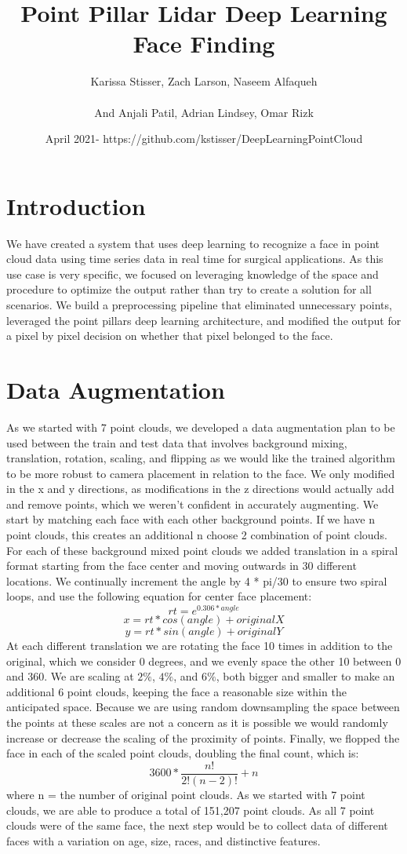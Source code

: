 \documentclass{article}
\title{Point Pillar Lidar Deep Learning Face Finding}
\author{Karissa Stisser, Zach Larson, Naseem Alfaqueh\\ \\And Anjali Patil, Adrian Lindsey, Omar Rizk }
\date{April 2021- https://github.com/kstisser/DeepLearningPointCloud}
\begin{document}
 
\maketitle 

\section{Introduction} We have created a system that uses deep learning to recognize a face in point cloud data using time series data in real time for surgical applications. As this use case is very specific, we focused on leveraging knowledge of the space and procedure to optimize the output rather than try to create a solution for all scenarios. We build a preprocessing pipeline that eliminated unnecessary points, leveraged the point pillars deep learning architecture\cite{pointpillars}, and modified the output for a pixel by pixel decision on whether that pixel belonged to the face. 

\section{Data Augmentation} As we started with 7 point clouds, we developed a data augmentation plan to be used between the train and test data that involves background mixing, translation, rotation, scaling, and flipping as we would like the trained algorithm to be more robust to camera placement in relation to the face. We only modified in the x and y directions, as modifications in the z directions would actually add and remove points, which we weren't confident in accurately augmenting. We start by matching each face with each other background points. If we have n point clouds, this creates an additional n choose 2 combination of point clouds. For each of these background mixed point clouds we added translation in a spiral format starting from the face center and moving outwards in 30 different locations. We continually increment the angle by 4 * pi/30 to ensure two spiral loops, and use the following equation for center face placement: \[rt = e^{0.306*angle}\] \[x = rt * cos(angle) + originalX\] \[y = rt * sin(angle) + originalY\] At each different translation we are rotating the face 10 times in addition to the original, which we consider 0 degrees, and we evenly space the other 10 between 0 and 360. We are scaling at ${2\%}$, ${4\%}$, and ${6\%}$, both bigger and smaller to make an additional 6 point clouds, keeping the face a reasonable size within the anticipated space. Because we are using random downsampling the space between the points at these scales are not a concern as it is possible we would randomly increase or decrease the scaling of the proximity of points. Finally, we flopped the face in each of the scaled point clouds, doubling the final count, which is: \[ 3600 * \frac{n!}{2!(n-2)!} + n \] where n = the number of original point clouds. As we started with 7 point clouds, we are able to produce a total of 151,207 point clouds. As all 7 point clouds were of the same face, the next step would be to collect data of different faces with a variation on age, size, races, and distinctive features. 
\end{document}
